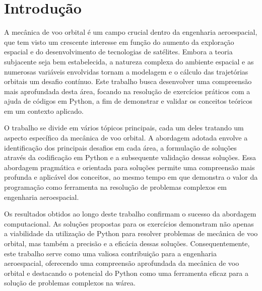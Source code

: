 \chapter{Introdução}

\par A mecânica de voo orbital é um campo crucial dentro da engenharia aeroespacial, que tem visto um crescente interesse em função do aumento da exploração espacial e do desenvolvimento de tecnologias de satélites. Embora a teoria subjacente seja bem estabelecida, a natureza complexa do ambiente espacial e as numerosas variáveis envolvidas tornam a modelagem e o cálculo das trajetórias orbitais um desafio contínuo. Este trabalho busca desenvolver uma compreensão mais aprofundada desta área, focando na resolução de exercícios práticos com a ajuda de códigos em Python, a fim de demonstrar e validar os conceitos teóricos em um contexto aplicado.

\par O trabalho se divide em vários tópicos principais, cada um deles tratando um aspecto específico da mecânica de voo orbital. A abordagem adotada envolve a identificação dos principais desafios em cada área, a formulação de soluções através da codificação em Python e a subsequente validação dessas soluções. Essa abordagem pragmática e orientada para soluções permite uma compreensão mais profunda e aplicável dos conceitos, ao mesmo tempo em que demonstra o valor da programação como ferramenta na resolução de problemas complexos em engenharia aeroespacial.

\par Os resultados obtidos ao longo deste trabalho confirmam o sucesso da abordagem computacional. As soluções propostas para os exercícios demonstram não apenas a viabilidade da utilização de Python para resolver problemas de mecânica de voo orbital, mas também a precisão e a eficácia dessas soluções. Consequentemente, este trabalho serve como uma valiosa contribuição para a engenharia aeroespacial, oferecendo uma compreensão aprofundada da mecânica de voo orbital e destacando o potencial do Python como uma ferramenta eficaz para a solução de problemas complexos na wárea.